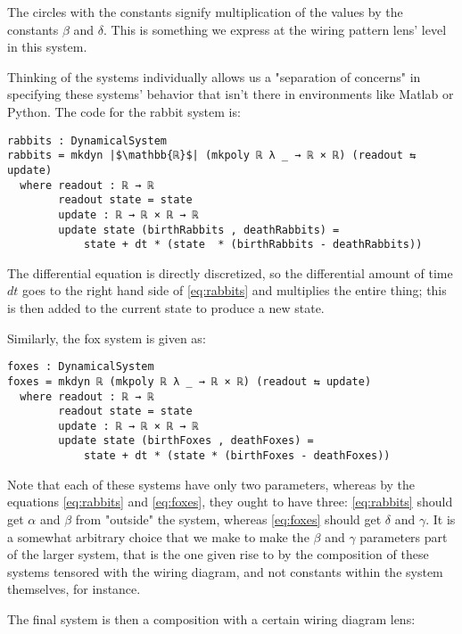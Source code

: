 The circles with the constants signify multiplication of the values by the constants $\beta$ and $\delta$. This is something we express at the wiring pattern lens' level in this system. 

Thinking of the systems individually allows us a "separation of concerns" in specifying these systems' behavior that isn't there in environments like Matlab or Python. The code for the rabbit system is:
\begin{verbatim}
rabbits : DynamicalSystem
rabbits = mkdyn |$\mathbb{ℝ}$| (mkpoly ℝ λ _ → ℝ × ℝ) (readout ⇆ update)
  where readout : ℝ → ℝ
        readout state = state
        update : ℝ → ℝ × ℝ → ℝ
        update state (birthRabbits , deathRabbits) = 
            state + dt * (state  * (birthRabbits - deathRabbits))
\end{verbatim}
The differential equation is directly discretized, so the differential amount of time $dt$ goes to the right hand side of \ref{eq:rabbits} and multiplies the entire thing; this is then added to the current state to produce a new state.

Similarly, the fox system is given as:
\begin{verbatim}
foxes : DynamicalSystem
foxes = mkdyn ℝ (mkpoly ℝ λ _ → ℝ × ℝ) (readout ⇆ update)
  where readout : ℝ → ℝ
        readout state = state
        update : ℝ → ℝ × ℝ → ℝ
        update state (birthFoxes , deathFoxes) = 
            state + dt * (state * (birthFoxes - deathFoxes))
\end{verbatim}

Note that each of these systems have only two parameters, whereas by the equations \ref{eq:rabbits} and \ref{eq:foxes}, they ought to have three: \ref{eq:rabbits} should get $\alpha$ and $\beta$ from "outside" the system, whereas \ref{eq:foxes} should get $\delta$ and $\gamma$. It is a somewhat arbitrary choice that we make to make the $\beta$ and $\gamma$ parameters part of the larger system, that is the one given rise to by the composition of these systems tensored with the wiring diagram, and not constants within the system themselves, for instance.

The final system is then a composition with a certain wiring diagram lens:

